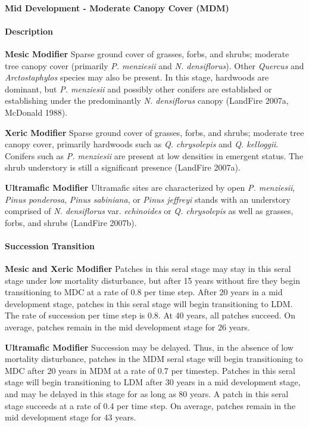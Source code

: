 \paragraph{Mid Development - Moderate Canopy Cover (MDM)}

\paragraph{Description}
\begin{adjustwidth}{2cm}{}
\textbf{Mesic Modifier } Sparse ground cover of grasses, forbs, and shrubs; moderate tree canopy cover (primarily \emph{P. menziesii} and \emph{ N. densiflorus}). Other \emph{Quercus} and \emph{Arctostaphylos} species may also be present. In this stage, hardwoods are dominant, but \emph{P. menziesii} and possibly other conifers are established or establishing under the predominantly \emph{N. densiflorus} canopy (LandFire 2007a, McDonald 1988). 


\medskip
\noindent \textbf{Xeric Modifier} Sparse ground cover of grasses, forbs, and shrubs; moderate tree canopy cover, primarily hardwoods such as \emph{Q. chrysolepis} and \emph{Q. kelloggii}. Conifers such as \emph{P. menziesii} are present at low densities in emergent status. The shrub understory is still a significant presence (LandFire 2007a). 


\medskip
\noindent \textbf{Ultramafic Modifier}  Ultramafic sites are characterized by open \emph{P. menziesii}, \emph{Pinus ponderosa}, \emph{Pinus sabiniana}, or \emph{Pinus jeffreyi} stands with an understory comprised of \emph{N. densiflorus} var. \emph{echinoides} or \emph{Q. chrysolepis} as well as grasses, forbs, and shrubs (LandFire 2007b).

\end{adjustwidth}
\paragraph{Succession Transition}
\begin{adjustwidth}{2cm}{}
\textbf{Mesic and Xeric Modifier } Patches in this seral stage may stay in this seral stage under low mortality disturbance, but after 15 years without fire they begin transitioning to MDC at a rate of 0.8 per time step. After 20 years in a mid development stage, patches in this seral stage will begin transitioning to LDM. The rate of succession per time step is 0.8. At 40 years, all patches succeed. On average, patches remain in the mid development stage for 26 years.


\medskip
\noindent \textbf{Ultramafic Modifier} Succession may be delayed. Thus, in the absence of low mortality disturbance, patches in the MDM seral stage will begin transitioning to MDC after 20 years in MDM at a rate of 0.7 per timestep. Patches in this seral stage will begin transitioning to LDM after 30 years in a mid development stage, and may be delayed in this stage for as long as 80 years. A patch in this seral stage succeeds at a rate of 0.4 per time step. On average, patches remain in the mid development stage for 43 years.

\end{adjustwidth}
